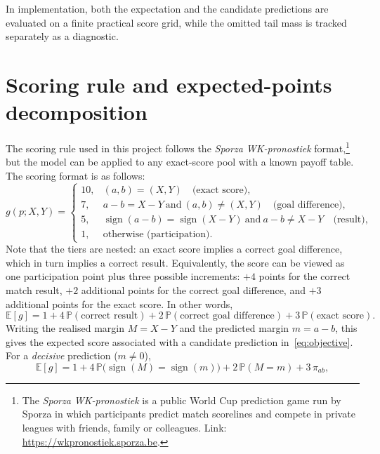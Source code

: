 \documentclass[11pt]{article}
\newcommand{\Prob}{\mathbb{P}}
\newcommand{\E}{\mathbb{E}}
\newcommand{\sgn}{\operatorname{sign}}
\begin{document}
In implementation, both the expectation and the candidate predictions are evaluated on a finite practical score grid, while the omitted tail mass is tracked separately as a diagnostic.


\section{Scoring rule and expected-points decomposition}

The scoring rule used in this project follows the \emph{Sporza WK-pronostiek} format,\footnote{The \emph{Sporza WK-pronostiek} is a public World Cup prediction game run by Sporza in which participants predict match scorelines and compete in private leagues with friends, family or colleagues. Link: \url{https://wkpronostiek.sporza.be}.} but the model can be applied to any exact-score pool with a known payoff table. The scoring format is as follows:
\begin{equation}
g(p;X,Y)=
\begin{cases}
10, & (a,b)=(X,Y)\quad\text{(exact score)},\\[2pt]
7,  & a-b=X-Y\ \text{and}\ (a,b)\neq(X,Y)\quad\text{(goal difference)},\\[2pt]
5,  & \sgn(a-b)=\sgn(X-Y)\ \text{and}\ a-b\neq X-Y\quad\text{(result)},\\[2pt]
1,  & \text{otherwise (participation).}
\end{cases}
\label{eq:scoring}
\end{equation}
Note that the tiers are nested: an exact score implies a correct goal difference, which in turn implies a correct result. Equivalently, the score can be viewed as one participation
point plus three possible increments: $+4$ points for the correct match result, $+2$
additional points for the correct goal difference, and $+3$ additional points for the
exact score. In other words,
\begin{equation}
\E[g] = 1 +4\,\Prob(\text{correct result}) +2\,\Prob(\text{correct goal difference}) +3\,\Prob(\text{exact score}).
\label{eq:expected_score_words}
\end{equation}
Writing the realised margin $M=X-Y$ and the predicted margin $m=a-b$, this gives the
expected score associated with a candidate prediction in~\eqref{eq:objective}. For a \emph{decisive} prediction
($m\neq 0$),
\begin{equation}
\E[g] = 1 +4\,\Prob\!\big(\sgn(M)=\sgn(m)\big) +2\,\Prob(M=m) +3\,\pi_{ab},
\label{eq:decisive}
\end{equation}
\end{document}
